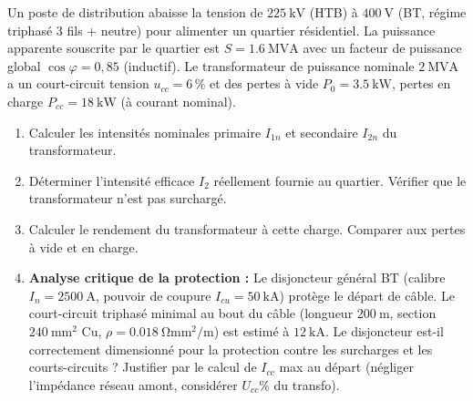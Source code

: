 \documentclass[11pt]{article}
\begin{document}
\begin{exercice}
Un poste de distribution abaisse la tension de $\SI{225}{\kilo\volt}$ (HTB) à $\SI{400}{\volt}$ (BT, régime triphasé 3 fils + neutre) pour alimenter un quartier résidentiel. La puissance apparente souscrite par le quartier est $S = \SI{1,6}{\mega\volt\ampere}$ avec un facteur de puissance global $\cos\varphi = 0,85$ (inductif). Le transformateur de puissance nominale $\SI{2}{\mega\volt\ampere}$ a un court-circuit tension $u_{cc} = 6\,\%$ et des pertes à vide $P_0 = \SI{3,5}{\kilo\watt}$, pertes en charge $P_{cc} = \SI{18}{\kilo\watt}$ (à courant nominal).
\begin{enumerate}
    \item Calculer les intensités nominales primaire $I_{1n}$ et secondaire $I_{2n}$ du transformateur.
    \item Déterminer l'intensité efficace $I_2$ réellement fournie au quartier. Vérifier que le transformateur n'est pas surchargé.
    \item Calculer le rendement du transformateur à cette charge. Comparer aux pertes à vide et en charge.
    \item \textbf{Analyse critique de la protection :} Le disjoncteur général BT (calibre $I_n = \SI{2500}{\ampere}$, pouvoir de coupure $I_{cu} = \SI{50}{\kilo\ampere}$) protège le départ de câble. Le court-circuit triphasé minimal au bout du câble (longueur $\SI{200}{\metre}$, section $\SI{240}{\mm\squared}$ Cu, $\rho = \SI{0,018}{\ohm\mm\squared\per\metre}$) est estimé à $\SI{12}{\kilo\ampere}$. Le disjoncteur est-il correctement dimensionné pour la protection contre les surcharges et les courts-circuits ? Justifier par le calcul de $I_{cc}$ max au départ (négliger l'impédance réseau amont, considérer $U_{cc}\%$ du transfo).
\end{enumerate}
\end{exercice}
\end{document}
